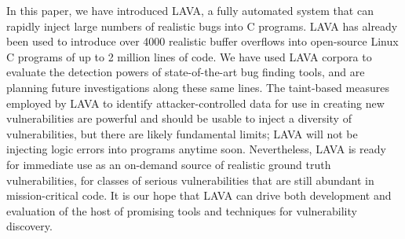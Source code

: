 In this paper, we have introduced LAVA, a fully automated system that can rapidly inject large numbers of realistic bugs into C programs.
LAVA has already been used to introduce over 4000 realistic buffer overflows into open-source Linux C programs of up to 2 million lines of code.  
We have used LAVA corpora to evaluate the detection powers of state-of-the-art bug finding tools, and are planning future investigations along these same lines.
The taint-based measures employed by LAVA to identify attacker-controlled data for use in creating new vulnerabilities are powerful and should be usable to inject a diversity of vulnerabilities, but there are likely fundamental limits; LAVA will not be injecting logic errors into programs anytime soon.
Nevertheless, LAVA is ready for immediate use as an on-demand source of realistic ground truth vulnerabilities, for classes of serious vulnerabilities that are still abundant in mission-critical code.
It is our hope that LAVA can drive both development and evaluation of the host of promising tools and techniques for vulnerability discovery.



